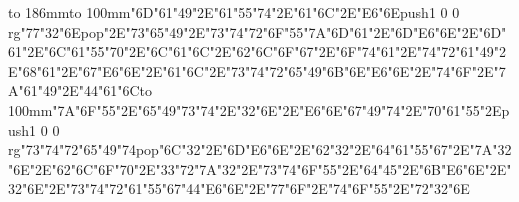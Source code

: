 \hbox to 186mm{\hsize=81mm\vbox to 100mm{\vfill\ipa\char"6D\ipa\char"61\ipa\char"49\ipa\char"2E\ipa\char"61\ipa\char"55\ipa\char"74\ipa\char"2E\ipa\char"61\ipa\char"6C\ipa\char"2E\ipa\char"E6\ipa\char"6E\medskip\pdfcolorstack\match push{1 0 0 rg}\ipa\char"77\ipa\char"32\ipa\char"6E\pdfcolorstack\match pop{}\ipa\char"2E\ipa\char"73\ipa\char"65\ipa\char"49\ipa\char"2E\ipa\char"73\ipa\char"74\ipa\char"72\ipa\char"6F\ipa\char"55\ipa\char"7A\medskip\ipa\char"6D\ipa\char"61\ipa\char"2E\ipa\char"6D\ipa\char"E6\ipa\char"6E\ipa\char"2E\ipa\char"6D\ipa\char"61\ipa\char"2E\ipa\char"6C\ipa\char"61\ipa\char"55\ipa\char"70\ipa\char"2E\ipa\char"6C\ipa\char"61\ipa\char"6C\ipa\char"2E\ipa\char"62\ipa\char"6C\ipa\char"6F\ipa\char"67\ipa\char"2E\ipa\char"6F\ipa\char"74\medskip\ipa\char"61\ipa\char"2E\ipa\char"74\ipa\char"72\ipa\char"61\ipa\char"49\ipa\char"2E\ipa\char"68\ipa\char"61\ipa\char"2E\ipa\char"67\ipa\char"E6\ipa\char"6E\ipa\char"2E\ipa\char"61\ipa\char"6C\ipa\char"2E\ipa\char"73\ipa\char"74\ipa\char"72\ipa\char"65\ipa\char"49\ipa\char"6B\medskip\ipa\char"6E\ipa\char"E6\ipa\char"6E\ipa\char"2E\ipa\char"74\ipa\char"6F\ipa\char"2E\ipa\char"7A\ipa\char"61\ipa\char"49\ipa\char"2E\ipa\char"44\ipa\char"61\ipa\char"6C\vfill}\hfill\vbox to 100mm{\vfill\ipa\char"7A\ipa\char"6F\ipa\char"55\ipa\char"2E\ipa\char"65\ipa\char"49\ipa\char"73\ipa\char"74\ipa\char"2E\ipa\char"32\ipa\char"6E\ipa\char"2E\ipa\char"E6\ipa\char"6E\medskip\ipa\char"67\ipa\char"49\ipa\char"74\ipa\char"2E\ipa\char"70\ipa\char"61\ipa\char"55\ipa\char"2E\pdfcolorstack\match push{1 0 0 rg}\ipa\char"73\ipa\char"74\ipa\char"72\ipa\char"65\ipa\char"49\ipa\char"74\pdfcolorstack\match pop{}\medskip\ipa\char"6C\ipa\char"32\ipa\char"2E\ipa\char"6D\ipa\char"E6\ipa\char"6E\ipa\char"2E\ipa\char"62\ipa\char"32\ipa\char"2E\ipa\char"64\ipa\char"61\ipa\char"55\ipa\char"67\ipa\char"2E\ipa\char"7A\ipa\char"32\ipa\char"6E\ipa\char"2E\ipa\char"62\ipa\char"6C\ipa\char"6F\ipa\char"70\ipa\char"2E\ipa\char"33\ipa\char"72\ipa\char"7A\medskip\ipa\char"32\ipa\char"2E\ipa\char"73\ipa\char"74\ipa\char"6F\ipa\char"55\ipa\char"2E\ipa\char"64\ipa\char"45\ipa\char"2E\ipa\char"6B\ipa\char"E6\ipa\char"6E\ipa\char"2E\ipa\char"32\ipa\char"6E\ipa\char"2E\ipa\char"73\ipa\char"74\ipa\char"72\ipa\char"61\ipa\char"55\ipa\char"67\medskip\ipa\char"44\ipa\char"E6\ipa\char"6E\ipa\char"2E\ipa\char"77\ipa\char"6F\ipa\char"2E\ipa\char"74\ipa\char"6F\ipa\char"55\ipa\char"2E\ipa\char"72\ipa\char"32\ipa\char"6E\vfill}}\eject
